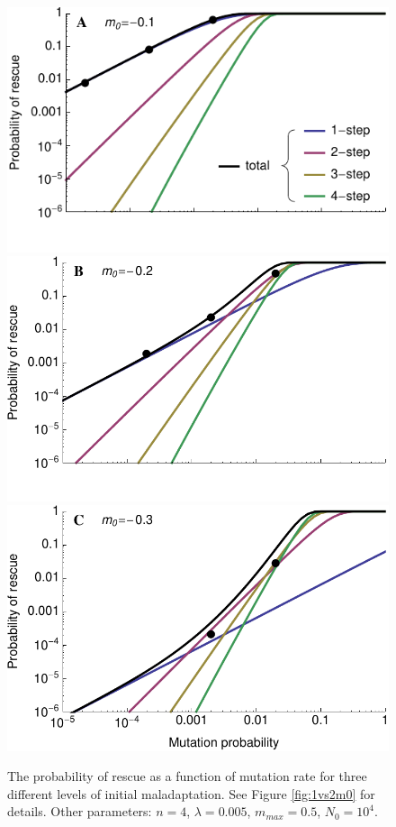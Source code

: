 \documentclass[9pt,twocolumn,twoside,lineno]{gsajnl}
\begin{document}
\begin{figure}[htbp]
\centering
\includegraphics[width=\linewidth]{../IMAGES/4step_lowm0.pdf}\\
\includegraphics[width=\linewidth]{../IMAGES/4step_medm0.pdf}\\
\includegraphics[width=\linewidth]{../IMAGES/4step_highm0.pdf}\\
\caption{
The probability of rescue as a function of mutation rate for three different levels of initial maladaptation.
See Figure \ref{fig:1vs2m0} for details.
Other parameters: $n=4$, $\lambda=0.005$, $m_{max}=0.5$, $N_0=10^4$.
}%
\label{fig:1vs2U}
\end{figure}
\end{document}
